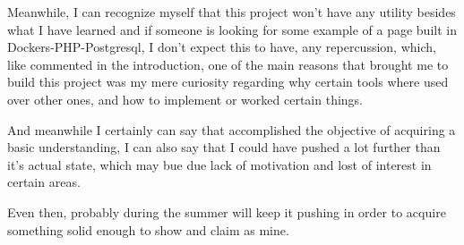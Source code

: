 \begin{flushleft}
    Meanwhile, I can recognize myself that this project won't have any utility besides what I have learned and if
    someone is looking for some example of a page built in Dockers-PHP-Postgresql, I don't expect this to have,
    any repercussion, which, like commented in the introduction, one of the main reasons that brought me to build this
    project was my mere curiosity regarding why certain tools where used over other ones, and how to implement or worked
    certain things.
\end{flushleft}
\begin{flushleft}
    And meanwhile I certainly can say that accomplished the objective of acquiring a basic understanding, I can also say
    that I could have pushed a lot further than it's actual state, which may bue due lack of motivation and lost of
    interest in certain areas.
\end{flushleft}
\begin{flushleft}
    Even then, probably during the summer will keep it pushing in order to acquire something solid enough to show and
    claim as mine.
\end{flushleft}